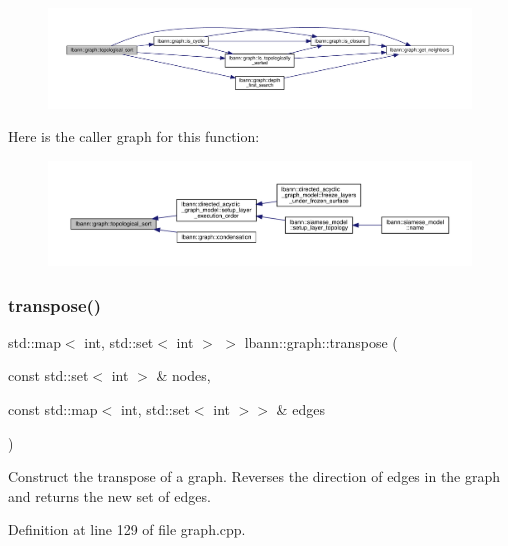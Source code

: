 \begin{figure}[H]
\begin{center}
\leavevmode
\includegraphics[width=350pt]{namespacelbann_1_1graph_aeb19a22d8fac402df104ed8d547a10ee_cgraph}
\end{center}
\end{figure}
Here is the caller graph for this function\+:\nopagebreak
\begin{figure}[H]
\begin{center}
\leavevmode
\includegraphics[width=350pt]{namespacelbann_1_1graph_aeb19a22d8fac402df104ed8d547a10ee_icgraph}
\end{center}
\end{figure}
\mbox{\label{namespacelbann_1_1graph_a53b0b97c3fc0b88f2fffd44f1b951c71}} 
\subsubsection{\texorpdfstring{transpose()}{transpose()}}
{\footnotesize\ttfamily std\+::map$<$ int, std\+::set$<$ int $>$ $>$ lbann\+::graph\+::transpose (\begin{DoxyParamCaption}\item[{const std\+::set$<$ int $>$ \&}]{nodes,  }\item[{const std\+::map$<$ int, std\+::set$<$ int $>$$>$ \&}]{edges }\end{DoxyParamCaption})}

Construct the transpose of a graph. Reverses the direction of edges in the graph and returns the new set of edges. 

Definition at line 129 of file graph.\+cpp.


